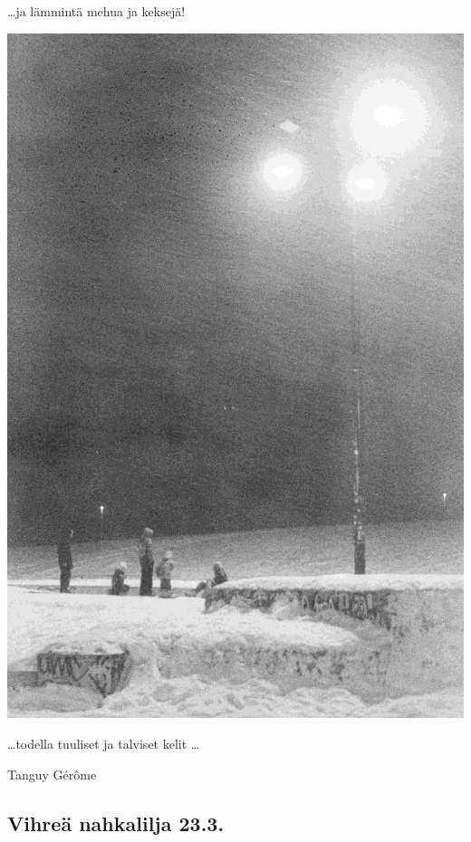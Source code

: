 \documentclass[10pt,finnish,a5paper,headings=small,twoside=semi]{scrartcl}
\begin{document}
\begin{multicols}{2}
	\ldots ja lämmintä mehua ja keksejä!
	\columnbreak

	\vspace*{1.28cm}
	\noindent\includegraphics[width=\linewidth]{assets/laskiaistiistai4}

	\ldots todella tuuliset ja talviset kelit \ldots

	\medskip
	\noindent\null\hfill Tanguy Gérôme

\end{multicols}

\clearpage
\subsection{Vihreä nahkalilja 23.3.}
\end{document}
